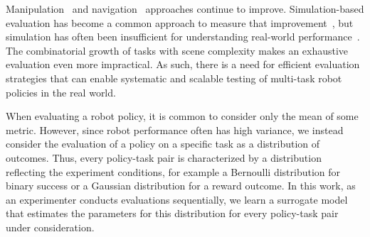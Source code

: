 Manipulation~\cite{octo_2023, kim24openvla, black2024pi_0} and navigation~\cite{shah2023lm,shah2023vint,anwar2024remembr} approaches continue to improve.
Simulation-based evaluation has become a common approach to measure that improvement~\cite{simpler_env}, but simulation has often been insufficient for understanding real-world performance~\cite{anderson2021sim,deitke2020robothor,simpler_env}.
The combinatorial growth of tasks with scene complexity makes an exhaustive evaluation even more impractical.
As such, there is a need for efficient evaluation strategies that can enable systematic and scalable testing of multi-task robot policies in the real world. 



When evaluating a robot policy, it is common to consider only the mean of some metric.
However, since robot performance often has high variance, we instead consider the evaluation of a policy on a specific task as a distribution of outcomes.
Thus, every policy-task pair is characterized by a distribution reflecting the experiment conditions, for example a Bernoulli distribution for binary success or a Gaussian distribution for a reward outcome.
In this work, as an experimenter conducts evaluations sequentially, we learn a surrogate model that estimates the parameters for this distribution for every policy-task pair under consideration.

